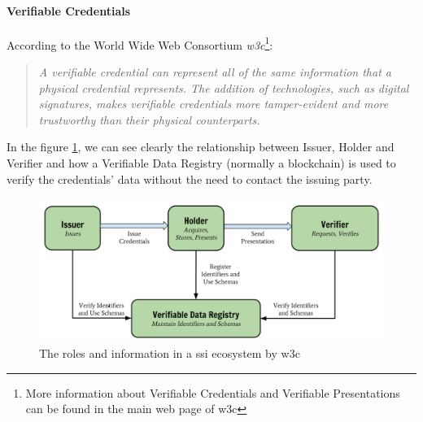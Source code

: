 \documentclass[a4paper, 12pt]{article} %
\begin{document}
                \paragraph{Verifiable Credentials}
                    According to the World Wide Web Consortium \textit{\acrshort{w3c}}\cite{w3c-vc}\footnote{\label{footnote-w3c}More information about Verifiable Credentials and Verifiable Presentations can be found in the main web page of \acrshort{w3c}\cite{w3c-vc}}:
                    \begin{quote}
                        \textit{A verifiable credential can represent all of the same information that a physical credential represents. The addition of technologies, such as digital signatures, makes verifiable credentials more tamper-evident and more trustworthy than their physical counterparts.}
                    \end{quote}
                    In the figure \ref{fig:ssi-vc}, we can see clearly the relationship between Issuer, Holder and Verifier and how a Verifiable Data Registry (normally a blockchain) is used to verify the credentials’ data without the need to contact the issuing party.
                    \begin{figure}[h]
                        \centering
                        \includegraphics[width=1.0\textwidth]{ssi-vc.png}
                        \caption{The roles and information in a \acrshort{ssi} ecosystem by \acrshort{w3c}}
                        \label{fig:ssi-vc}
                    \end{figure}
                
\end{document}
